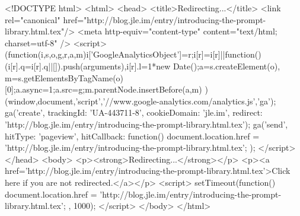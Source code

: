 <!DOCTYPE html>
<html>
<head>
<title>Redirecting...</title>
<link rel="canonical" href="http://blog.jle.im/entry/introducing-the-prompt-library.html.tex"/>
<meta http-equiv="content-type" content="text/html; charset=utf-8" />
<script>
(function(i,s,o,g,r,a,m){i['GoogleAnalyticsObject']=r;i[r]=i[r]||function(){
(i[r].q=i[r].q||[]).push(arguments)},i[r].l=1*new Date();a=s.createElement(o),
m=s.getElementsByTagName(o)[0];a.async=1;a.src=g;m.parentNode.insertBefore(a,m)
})(window,document,'script','//www.google-analytics.com/analytics.js','ga');
ga('create', { trackingId: 'UA-443711-8', cookieDomain: 'jle.im', redirect: 'http://blog.jle.im/entry/introducing-the-prompt-library.html.tex'});
ga('send', { hitType: 'pageview', hitCallback: function() { document.location.href = 'http://blog.jle.im/entry/introducing-the-prompt-library.html.tex'; } });
</script>
</head>
<body>
  <p><strong>Redirecting...</strong></p>
  <p><a href='http://blog.jle.im/entry/introducing-the-prompt-library.html.tex'>Click here if you are not redirected.</a></p>
  <script>
    setTimeout(function() { document.location.href = 'http://blog.jle.im/entry/introducing-the-prompt-library.html.tex'; }, 1000);
  </script>
</body>
</html>

